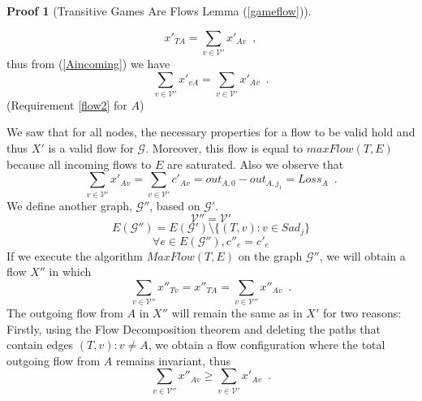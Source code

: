 \documentclass[11pt]{llncs}
\theoremstyle{definition}
\newtheorem{sepproof}{Proof}
\begin{document}
\begin{sepproof}[Transitive Games Are Flows Lemma (\ref{gameflow})]
\begin{itemize}
\begin{equation*}
             x'_{TA} = \sum\limits_{v \in \mathcal{V}'}x'_{Av} \enspace,
          \end{equation*}
          thus from (\ref{Aincoming}) we have
          \begin{equation*}
             \sum\limits_{v \in \mathcal{V}'}x'_{vA} = \sum\limits_{v \in \mathcal{V}'}x'_{Av} \enspace.
          \end{equation*}
          (Requirement \ref{flow2} for $A$)
       \end{itemize}
       We saw that for all nodes, the necessary properties for a flow to be valid hold and thus $X'$ is a valid flow for
       $\mathcal{G}$. Moreover, this flow is equal to $maxFlow(T, E)$ because all incoming flows to $E$ are saturated.
       Also we observe that
       \begin{equation}
       \label{xprimeequalloss}
          \sum\limits_{v \in \mathcal{V}'}x'_{Av} = \sum\limits_{v \in \mathcal{V}'}c'_{Av} = out_{A, 0} - out_{A, j_1} =
          Loss_A \enspace.
       \end{equation}
       We define another graph, $\mathcal{G}''$, based on $\mathcal{G}'$.
       \begin{equation*}
          \mathcal{V}'' = \mathcal{V}'
       \end{equation*}
       \begin{equation*}
          E(\mathcal{G}'') = E(\mathcal{G}') \setminus \{(T, v) : v \in Sad_j\}
       \end{equation*}
       \begin{equation*}
          \forall e \in E(\mathcal{G}''), c''_e = c'_e
       \end{equation*}
       If we execute the algorithm $MaxFlow(T, E)$ on the graph $\mathcal{G}''$, we will obtain a flow $X''$ in which
       \begin{equation*}
          \sum\limits_{v \in \mathcal{V}''}x''_{Tv} = x''_{TA} = \sum\limits_{v \in \mathcal{V}''}x''_{Av} \enspace.
       \end{equation*}
       The outgoing flow from $A$ in $X''$ will remain the same as in $X'$ for two reasons: Firstly, using the Flow
       Decomposition theorem \cite{amo} and deleting the paths that contain edges $\left(T, v\right): v \neq A$, we
       obtain a flow configuration where the total outgoing flow from $A$ remains invariant,
       thus
       \begin{equation*}
          \sum\limits_{v \in \mathcal{V}''}x''_{Av} \geq \sum\limits_{v \in \mathcal{V}'}x'_{Av} \enspace.

\end{equation*}
\end{sepproof}
\end{document}
